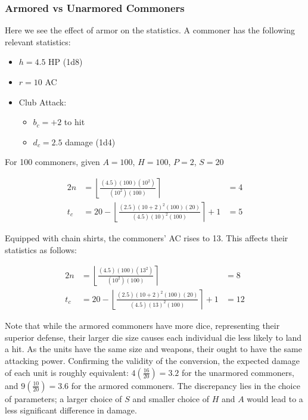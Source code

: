 \documentclass[twocolumn]{article}
\begin{document}
\subsubsection{Armored vs Unarmored Commoners}

Here we see the effect of armor on the statistics.
A commoner has the following relevant statistics:

\begin{itemize}
    \item $h = 4.5$ HP (1d8)
    \item $r = 10$ AC
    \item Club Attack:
        \begin{itemize}
            \item $b_c = +2$ to hit
            \item $d_c = 2.5$ damage (1d4)
        \end{itemize}
\end{itemize}


For 100 commoners, given $A = 100$, $H = 100$, $P = 2$, $S = 20$

\begin{alignat*}{2}
    n   &=  
        \left\lfloor
            \frac
                {(4.5) (100) (10^2)}
                {(10^2) (100)}
        \right\rceil
            &= 4
    \\
    t_c &=
        20 -
        \left\lfloor
            \frac
                {(2.5) (10 + 2)^2 (100) (20)}
                {(4.5) (10)^2 (100)}
        \right\rceil
        + 1
            &= 5
\end{alignat*}

Equipped with chain shirts, the commoners' AC rises to 13.
This affects their statistics as follows:

\begin{alignat*}{2}
    n   &=  
        \left\lfloor
            \frac
                {(4.5) (100) (13^2)}
                {(10^2) (100)}
        \right\rceil
            &= 8
    \\
    t_c &=
        20 - 
        \left\lfloor
            \frac
                {(2.5) (10 + 2)^2 (100) (20)}
                {(4.5) (13)^2 (100)}
        \right\rceil
        + 1
            &= 12
\end{alignat*}

Note that while the armored commoners have more dice,
representing their superior defense,
their larger die size causes each individual die less likely to land a hit.
As the units have the same size and weapons,
their ought to have the same attacking power.
Confirming the validity of the conversion,
the expected damage of each unit is roughly equivalent:
$4(\frac{16}{20}) = 3.2$ for the unarmored commoners,
and $9(\frac{10}{20}) = 3.6$ for the armored commoners.
The discrepancy lies in the choice of parameters;
a larger choice of $S$ and smaller choice of $H$ and $A$
would lead to a less significant difference in damage.
\end{document}
